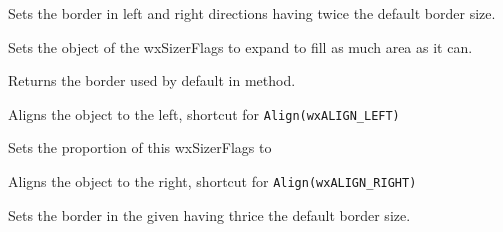 \label{wxsizerflagsdoublehorzborder}


Sets the border in left and right directions having twice the default border
size.


\label{wxsizerflagsexpand}


Sets the object of the wxSizerFlags to expand to fill as much area as it can.


\label{wxsizerflagsgetdefaultborder}


Returns the border used by default in  method.


\label{wxsizerflagsleft}


Aligns the object to the left, shortcut for \texttt{Align(wxALIGN\_LEFT)}




\label{wxsizerflagsproportion}


Sets the proportion of this wxSizerFlags to 


\label{wxsizerflagsright}


Aligns the object to the right, shortcut for \texttt{Align(wxALIGN\_RIGHT)}




\label{wxsizerflagstriplebleborder}


Sets the border in the given  having thrice the default border
size.


